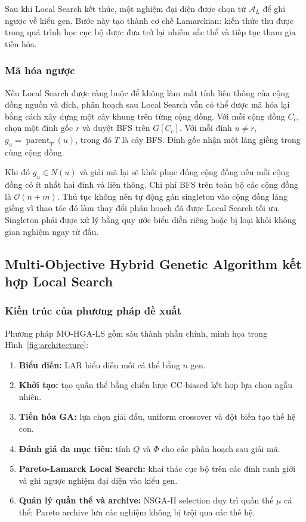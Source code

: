 \documentclass[14pt,a4paper]{extarticle}
\begin{document}
Sau khi Local Search kết thúc, một nghiệm đại diện được chọn từ $\mathcal{A}_L$ để ghi ngược về kiểu gen. Bước này tạo thành cơ chế Lamarckian: kiến thức thu được trong quá trình học cục bộ được đưa trở lại nhiễm sắc thể và tiếp tục tham gia tiến hóa.

\subsubsection{Mã hóa ngược}

Nếu Local Search được ràng buộc để không làm mất tính liên thông của cộng đồng nguồn và đích, phân hoạch sau Local Search vẫn có thể được mã hóa lại bằng cách xây dựng một cây khung trên từng cộng đồng. Với mỗi cộng đồng $C_c$, chọn một đỉnh gốc $r$ và duyệt BFS trên $G[C_c]$. Với mỗi đỉnh $u\neq r$,
$g_u=\operatorname{parent}_{T}(u)$, 
trong đó $T$ là cây BFS. Đỉnh gốc nhận một láng giềng trong cùng cộng đồng.

Khi đó $g_u\in N(u)$ và giải mã lại sẽ khôi phục đúng cộng đồng nếu mỗi cộng đồng có ít nhất hai đỉnh và liên thông. Chi phí BFS trên toàn bộ các cộng đồng là
$\mathcal{O}(n+m)$.
Thủ tục không nên tự động gán singleton vào cộng đồng láng giềng vì thao tác đó làm thay đổi phân hoạch đã được Local Search tối ưu. Singleton phải được xử lý bằng quy ước biểu diễn riêng hoặc bị loại khỏi không gian nghiệm ngay từ đầu.


\subsection[Multi-Objective Hybrid Genetic Algorithm\\kết hợp Local Search]{Multi-Objective Hybrid Genetic Algorithm kết hợp Local Search}

\subsubsection{Kiến trúc của phương pháp đề xuất}
Phương pháp MO-HGA-LS gồm sáu thành phần chính, minh họa trong Hình~\ref{fig:architecture}:
\begin{enumerate}
    \item \textbf{Biểu diễn:} LAR biểu diễn mỗi cá thể bằng $n$ gen.
    \item \textbf{Khởi tạo:} tạo quần thể bằng chiến lược CC-biased kết hợp lựa chọn ngẫu nhiên.
    \item \textbf{Tiến hóa GA:} lựa chọn giải đấu, uniform crossover và đột biến tạo thế hệ con.
    \item \textbf{Đánh giá đa mục tiêu:} tính $Q$ và $\Phi$ cho các phân hoạch sau giải mã.
    \item \textbf{Pareto-Lamarck Local Search:} khai thác cục bộ trên các đỉnh ranh giới và ghi ngược nghiệm đại diện vào kiểu gen.
    \item \textbf{Quản lý quần thể và archive:} NSGA-II selection duy trì quần thể $\mu$ cá thể; Pareto archive lưu các nghiệm không bị trội qua các thế hệ.
\end{enumerate}
\end{document}
